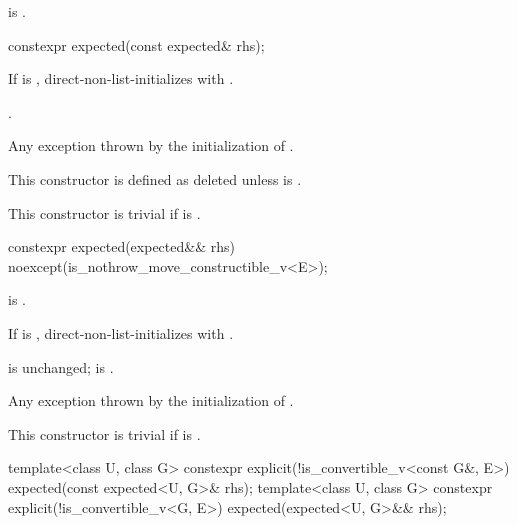 \begin{itemdescr}
\pnum
\ensures
{} is .
\end{itemdescr}

%
\begin{itemdecl}
constexpr expected(const expected& rhs);
\end{itemdecl}

\begin{itemdescr}
\pnum
\effects
If  is ,
direct-non-list-initializes  with .

\pnum
\ensures
{}.

\pnum
\throws
Any exception thrown by the initialization of .

\pnum
\remarks
This constructor is defined as deleted
unless  is .

\pnum
This constructor is trivial
if  is .
\end{itemdescr}

%
\begin{itemdecl}
constexpr expected(expected&& rhs) noexcept(is_nothrow_move_constructible_v<E>);
\end{itemdecl}

\begin{itemdescr}
\pnum
\constraints
{} is .

\pnum
\effects
If  is ,
direct-non-list-initializes  with .

\pnum
\ensures
{} is unchanged;
 is .

\pnum
\throws
Any exception thrown by the initialization of .

\pnum
\remarks
This constructor is trivial
if  is .
\end{itemdescr}

%
\begin{itemdecl}
template<class U, class G>
  constexpr explicit(!is_convertible_v<const G&, E>) expected(const expected<U, G>& rhs);
template<class U, class G>
  constexpr explicit(!is_convertible_v<G, E>) expected(expected<U, G>&& rhs);
\end{itemdecl}

